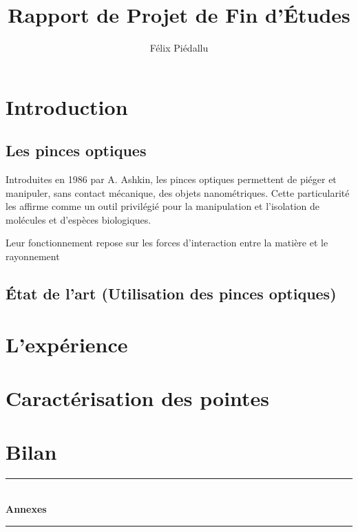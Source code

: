\documentclass[a4paper,12pt]{report}
\date{}
\title{Rapport de Projet de Fin d'Études}
\author{Félix Piédallu}
\begin{document}
\nocite{*}


\chapter*{Introduction} %
\section*{Les pinces optiques}
Introduites en 1986 par A. Ashkin\cite{Ashkin}, les pinces optiques permettent de piéger et manipuler, sans contact mécanique, des objets nanométriques. Cette particularité les affirme comme un outil privilégié pour la manipulation et l'isolation de molécules et d'espèces biologiques.

Leur fonctionnement repose sur les forces d'interaction entre la matière et le rayonnement 



\section*{État de l'art (Utilisation des pinces optiques)}
%

\chapter{L'expérience}


\chapter{Caractérisation des pointes}


\chapter*{Bilan}
%





\newpage
\appendix
{}
{}

\vspace*{8cm}
\begin{center}
\rule{\linewidth}{0.5mm}\\[0.7cm]
{\huge{\bfseries Annexes}}\\[0.4cm]
\rule{\linewidth}{0.5mm}\\[0.5cm]


\end{center}
%

\newpage
%
\end{document}
